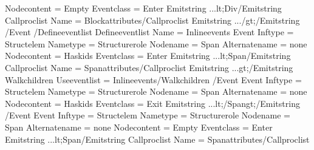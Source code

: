 \documentclass[letterpaper,12pt,english,openany,oneside]{sphinxmanual}
\begin{document}
\begin{sphinxVerbatim}[commandchars=\\\{\}]
            Node\PYGZhy{}content = \PYGZdq{}Empty\PYGZdq{} Event\PYGZhy{}class = \PYGZdq{}Enter\PYGZdq{}\PYGZgt{}
      \PYGZlt{}Emit\PYGZhy{}string ...\PYGZgt{}\PYGZam{}lt;Div\PYGZlt{}/Emit\PYGZhy{}string\PYGZgt{}
      \PYGZlt{}Call\PYGZhy{}proc\PYGZhy{}list Name = \PYGZdq{}Block\PYGZhy{}attributes\PYGZdq{}\PYGZgt{}\PYGZlt{}/Call\PYGZhy{}proc\PYGZhy{}list\PYGZgt{}
      \PYGZlt{}Emit\PYGZhy{}string ...\PYGZgt{}/\PYGZam{}gt;\PYGZlt{}/Emit\PYGZhy{}string\PYGZgt{}
    \PYGZlt{}/Event\PYGZgt{}
  \PYGZlt{}/Define\PYGZhy{}event\PYGZhy{}list\PYGZgt{}
  \PYGZlt{}Define\PYGZhy{}event\PYGZhy{}list Name = \PYGZdq{}Inline\PYGZhy{}events\PYGZdq{}\PYGZgt{}
    \PYGZlt{}Event  Inf\PYGZhy{}type = \PYGZdq{}Struct\PYGZhy{}elem\PYGZdq{} Name\PYGZhy{}type = \PYGZdq{}Structure\PYGZhy{}role\PYGZdq{}
            Node\PYGZhy{}name = \PYGZdq{}Span\PYGZdq{} Alternate\PYGZhy{}name = \PYGZdq{}\PYGZhy{}none\PYGZhy{}\PYGZdq{}
            Node\PYGZhy{}content = \PYGZdq{}Has\PYGZhy{}kids\PYGZdq{} Event\PYGZhy{}class = \PYGZdq{}Enter\PYGZdq{}\PYGZgt{}
      \PYGZlt{}Emit\PYGZhy{}string ...\PYGZgt{}\PYGZam{}lt;Span\PYGZlt{}/Emit\PYGZhy{}string\PYGZgt{}
      \PYGZlt{}Call\PYGZhy{}proc\PYGZhy{}list Name = \PYGZdq{}Span\PYGZhy{}attributes\PYGZdq{}\PYGZgt{}\PYGZlt{}/Call\PYGZhy{}proc\PYGZhy{}list\PYGZgt{}
      \PYGZlt{}Emit\PYGZhy{}string ...\PYGZgt{}\PYGZam{}gt;\PYGZlt{}/Emit\PYGZhy{}string\PYGZgt{}
      \PYGZlt{}Walk\PYGZhy{}children Use\PYGZhy{}event\PYGZhy{}list = \PYGZdq{}Inline\PYGZhy{}events\PYGZdq{}\PYGZgt{}\PYGZlt{}/Walk\PYGZhy{}children\PYGZgt{}
    \PYGZlt{}/Event\PYGZgt{}
    \PYGZlt{}Event  Inf\PYGZhy{}type = \PYGZdq{}Struct\PYGZhy{}elem\PYGZdq{} Name\PYGZhy{}type = \PYGZdq{}Structure\PYGZhy{}role\PYGZdq{}
            Node\PYGZhy{}name = \PYGZdq{}Span\PYGZdq{} Alternate\PYGZhy{}name = \PYGZdq{}\PYGZhy{}none\PYGZhy{}\PYGZdq{}
            Node\PYGZhy{}content = \PYGZdq{}Has\PYGZhy{}kids\PYGZdq{} Event\PYGZhy{}class = \PYGZdq{}Exit\PYGZdq{}\PYGZgt{}
      \PYGZlt{}Emit\PYGZhy{}string ...\PYGZgt{}\PYGZam{}lt;/Span\PYGZam{}gt;\PYGZlt{}/Emit\PYGZhy{}string\PYGZgt{}
    \PYGZlt{}/Event\PYGZgt{}
    \PYGZlt{}Event  Inf\PYGZhy{}type = \PYGZdq{}Struct\PYGZhy{}elem\PYGZdq{} Name\PYGZhy{}type = \PYGZdq{}Structure\PYGZhy{}role\PYGZdq{}
            Node\PYGZhy{}name = \PYGZdq{}Span\PYGZdq{} Alternate\PYGZhy{}name = \PYGZdq{}\PYGZhy{}none\PYGZhy{}\PYGZdq{}
            Node\PYGZhy{}content = \PYGZdq{}Empty\PYGZdq{} Event\PYGZhy{}class = \PYGZdq{}Enter\PYGZdq{}\PYGZgt{}
      \PYGZlt{}Emit\PYGZhy{}string ...\PYGZgt{}\PYGZam{}lt;Span\PYGZlt{}/Emit\PYGZhy{}string\PYGZgt{}
      \PYGZlt{}Call\PYGZhy{}proc\PYGZhy{}list Name = \PYGZdq{}Span\PYGZhy{}attributes\PYGZdq{}\PYGZgt{}\PYGZlt{}/Call\PYGZhy{}proc\PYGZhy{}list\PYGZgt{}

\end{sphinxVerbatim}
\end{document}
